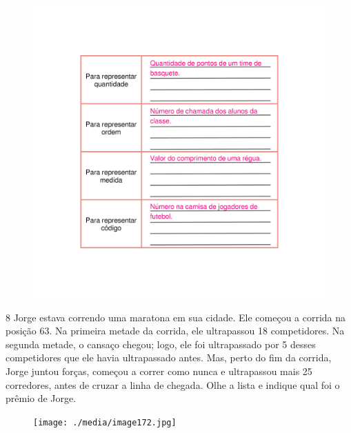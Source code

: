 \begin{figure}[htpb!]
\includegraphics[width=\textwidth]{./media/image9_prof.png}
\end{figure}


\pagebreak

\num{8} Jorge estava correndo uma maratona em sua cidade. Ele começou a corrida
na posição 63. Na primeira metade da corrida, ele ultrapassou 18
competidores. Na segunda metade, o cansaço chegou; logo, ele foi
ultrapassado por 5 desses competidores que ele havia ultrapassado antes.
Mas, perto do fim da corrida, Jorge juntou forças, começou a correr como
nunca e ultrapassou mais 25 corredores, antes de cruzar a linha de
chegada. Olhe a lista e indique qual foi o prêmio de Jorge.

\begin{figure}[htpb!]
\begin{center}
\texttt{[image: ./media/image172.jpg]}
\end{center}
\end{figure}

\vspace*{-2em}

